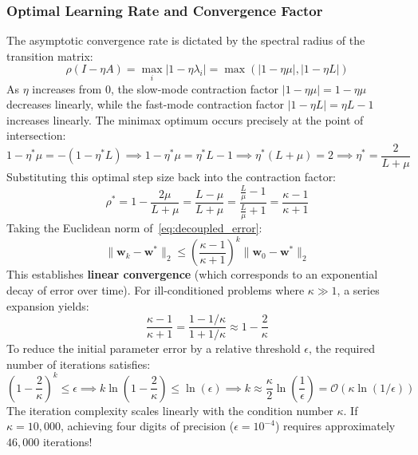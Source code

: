 \subsubsection{Optimal Learning Rate and Convergence Factor}
The asymptotic convergence rate is dictated by the spectral radius of the transition matrix:
\begin{equation}
\rho(I - \eta A) = \max_{i} |1 - \eta \lambda_i| = \max \left( |1 - \eta \mu|, |1 - \eta L| \right)
\end{equation}
As $\eta$ increases from $0$, the slow-mode contraction factor $|1 - \eta \mu| = 1 - \eta \mu$ decreases linearly, while the fast-mode contraction factor $|1 - \eta L| = \eta L - 1$ increases linearly. The minimax optimum occurs precisely at the point of intersection:
\begin{equation}
1 - \eta^* \mu = -(1 - \eta^* L) \implies 1 - \eta^* \mu = \eta^* L - 1 \implies \eta^*(L + \mu) = 2 \implies \eta^* = \frac{2}{L + \mu}
\label{eq:optimal_eta}
\end{equation}
Substituting this optimal step size back into the contraction factor:
\begin{equation}
\rho^* = 1 - \frac{2\mu}{L + \mu} = \frac{L - \mu}{L + \mu} = \frac{\frac{L}{\mu} - 1}{\frac{L}{\mu} + 1} = \frac{\kappa - 1}{\kappa + 1}
\label{eq:condition_contraction}
\end{equation}
Taking the Euclidean norm of~\eqref{eq:decoupled_error}:
\begin{equation}
\|\mathbf{w}_k - \mathbf{w}^*\|_2 \le \left( \frac{\kappa - 1}{\kappa + 1} \right)^k \|\mathbf{w}_0 - \mathbf{w}^*\|_2
\label{eq:linear_conv_rate}
\end{equation}
This establishes \textbf{linear convergence} (which corresponds to an exponential decay of error over time). For ill-conditioned problems where $\kappa \gg 1$, a series expansion yields:
\begin{equation}
\frac{\kappa - 1}{\kappa + 1} = \frac{1 - 1/\kappa}{1 + 1/\kappa} \approx 1 - \frac{2}{\kappa}
\end{equation}
To reduce the initial parameter error by a relative threshold $\epsilon$, the required number of iterations satisfies:
\begin{equation}
\left( 1 - \frac{2}{\kappa} \right)^k \le \epsilon \implies k \ln\left(1 - \frac{2}{\kappa}\right) \le \ln(\epsilon) \implies k \approx \frac{\kappa}{2} \ln\left(\frac{1}{\epsilon}\right) = \mathcal{O}\left(\kappa \ln(1/\epsilon)\right)
\end{equation}
The iteration complexity scales linearly with the condition number $\kappa$. If $\kappa = 10{,}000$, achieving four digits of precision ($\epsilon = 10^{-4}$) requires approximately $46{,}000$ iterations!

